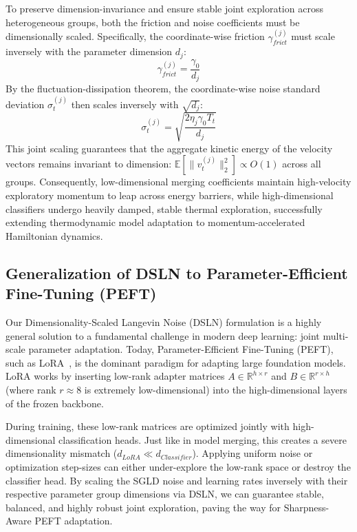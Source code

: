 \documentclass{article}
\theoremstyle{plain}
\theoremstyle{definition}
\theoremstyle{remark}
\begin{document}
To preserve dimension-invariance and ensure stable joint exploration across heterogeneous groups, both the friction and noise coefficients must be dimensionally scaled. Specifically, the coordinate-wise friction $\gamma_{frict}^{(j)}$ must scale inversely with the parameter dimension $d_j$:
\begin{equation}
    \gamma_{frict}^{(j)} = \frac{\gamma_0}{d_j}
\end{equation}
By the fluctuation-dissipation theorem, the coordinate-wise noise standard deviation $\sigma_t^{(j)}$ then scales inversely with $\sqrt{d_j}$:
\begin{equation}
    \sigma_t^{(j)} = \sqrt{\frac{2 \eta_j \gamma_0 T_t}{d_j}}
\end{equation}
This joint scaling guarantees that the aggregate kinetic energy of the velocity vectors remains invariant to dimension: $\mathbb{E}[\|v_t^{(j)}\|_2^2] \propto O(1)$ across all groups. Consequently, low-dimensional merging coefficients maintain high-velocity exploratory momentum to leap across energy barriers, while high-dimensional classifiers undergo heavily damped, stable thermal exploration, successfully extending thermodynamic model adaptation to momentum-accelerated Hamiltonian dynamics.

\subsection{Generalization of DSLN to Parameter-Efficient Fine-Tuning (PEFT)}
Our Dimensionality-Scaled Langevin Noise (DSLN) formulation is a highly general solution to a fundamental challenge in modern deep learning: joint multi-scale parameter adaptation. Today, Parameter-Efficient Fine-Tuning (PEFT), such as LoRA~\cite{hu2021lora}, is the dominant paradigm for adapting large foundation models. LoRA works by inserting low-rank adapter matrices $A \in \mathbb{R}^{h \times r}$ and $B \in \mathbb{R}^{r \times h}$ (where rank $r \approx 8$ is extremely low-dimensional) into the high-dimensional layers of the frozen backbone. 

During training, these low-rank matrices are optimized jointly with high-dimensional classification heads. Just like in model merging, this creates a severe dimensionality mismatch ($d_{LoRA} \ll d_{Classifier}$). Applying uniform noise or optimization step-sizes can either under-explore the low-rank space or destroy the classifier head. By scaling the SGLD noise and learning rates inversely with their respective parameter group dimensions via DSLN, we can guarantee stable, balanced, and highly robust joint exploration, paving the way for Sharpness-Aware PEFT adaptation.
\end{document}
